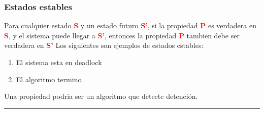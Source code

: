 \subsubsection{Estados estables}
Para cualquier estado \textcolor{red}{\textbf{S}} y un estado futuro \textcolor{red}{\textbf{S'}}, si la propiedad \textcolor{red}{\textbf{P}} es verdadera en \textcolor{red}{\textbf{S}}, y el sistema puede llegar a \textcolor{red}{\textbf{S'}}, entonces la propiedad \textcolor{red}{\textbf{P}} tambien debe ser verdadera en \textcolor{red}{\textbf{S'}}
Los siguientes son ejemplos de estados estables:
\begin{enumerate}
  \item El sistema esta en deadlock
  \item El algoritmo termino
\end{enumerate}
Una propiedad podria ser un algoritmo que detecte detención.


\noindent\rule{\linewidth}{0.1pt}
